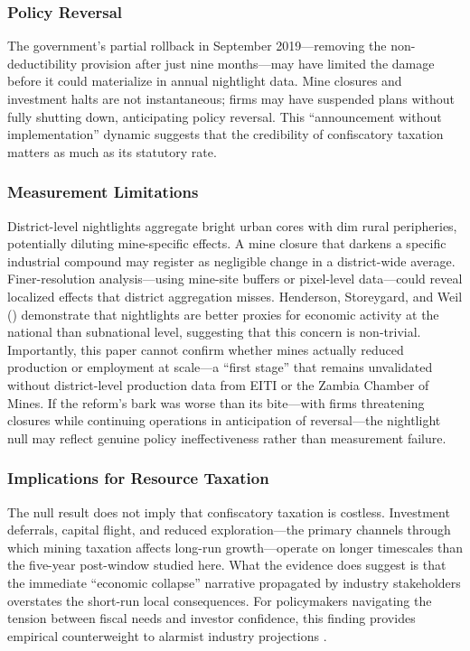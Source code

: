 \documentclass[12pt]{article}
\begin{document}
\subsubsection*{Policy Reversal} The government's partial rollback in September 2019---removing the non-deductibility provision after just nine months---may have limited the damage before it could materialize in annual nightlight data. Mine closures and investment halts are not instantaneous; firms may have suspended plans without fully shutting down, anticipating policy reversal. This ``announcement without implementation'' dynamic suggests that the credibility of confiscatory taxation matters as much as its statutory rate.

\subsubsection*{Measurement Limitations} District-level nightlights aggregate bright urban cores with dim rural peripheries, potentially diluting mine-specific effects. A mine closure that darkens a specific industrial compound may register as negligible change in a district-wide average. Finer-resolution analysis---using mine-site buffers or pixel-level data---could reveal localized effects that district aggregation misses. Henderson, Storeygard, and Weil (\citeyear{henderson2012measuring}) demonstrate that nightlights are better proxies for economic activity at the national than subnational level, suggesting that this concern is non-trivial. Importantly, this paper cannot confirm whether mines actually reduced production or employment at scale---a ``first stage'' that remains unvalidated without district-level production data from EITI or the Zambia Chamber of Mines. If the reform's bark was worse than its bite---with firms threatening closures while continuing operations in anticipation of reversal---the nightlight null may reflect genuine policy ineffectiveness rather than measurement failure.

\subsubsection*{Implications for Resource Taxation} The null result does not imply that confiscatory taxation is costless. Investment deferrals, capital flight, and reduced exploration---the primary channels through which mining taxation affects long-run growth---operate on longer timescales than the five-year post-window studied here. What the evidence does suggest is that the immediate ``economic collapse'' narrative propagated by industry stakeholders overstates the short-run local consequences. For policymakers navigating the tension between fiscal needs and investor confidence, this finding provides empirical counterweight to alarmist industry projections \citep{venables2016using,collier2010plundered}.
\end{document}
